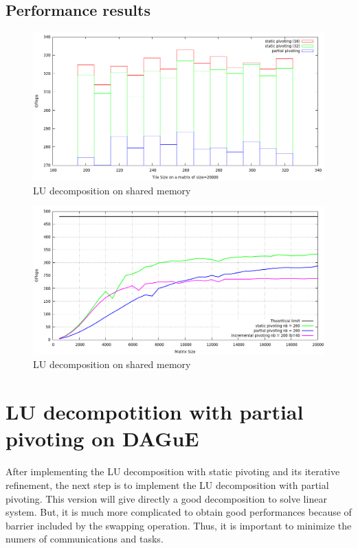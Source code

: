 \documentclass{report}
\begin{document}
\subsection{Performance results}

\begin{figure}[!ht]
\begin{center}
\includegraphics[width=\textwidth]{dgetrf_dague_remus_tile.png} 
\end{center}
\caption{LU decomposition on shared memory}
\end{figure}


\begin{figure}[!ht]
\begin{center}
\includegraphics[width=\textwidth]{dgetrf_dague_remus.png} 
\end{center}
\caption{LU decomposition on shared memory}
\end{figure}

\section{LU decompotition with partial pivoting on DAGuE}
After implementing the LU decomposition with static pivoting and its iterative refinement, the next step is to implement the LU decomposition with partial pivoting. This version will give directly a good decomposition to solve linear system. But, it is much more complicated to obtain good performances because of barrier included by the swapping operation. Thus, it is important to minimize the numers of communications and tasks.
\end{document}

